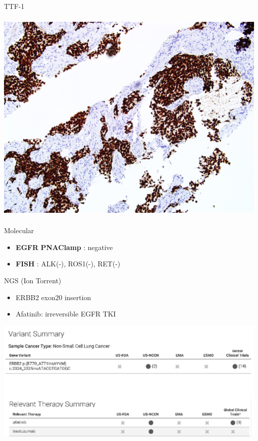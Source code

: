 \documentclass[
  ignorenonframetext,
]{beamer}
\providecommand{\tightlist}{%
  \setlength{\itemsep}{0pt}\setlength{\parskip}{0pt}}
\begin{document}
\begin{frame}{TTF-1}
\protect\hypertarget{ttf-1}{}

\includegraphics[width=\textwidth,height=4.16667in]{assets/img/immuno.png}

\end{frame}

\begin{frame}{Molecular}
\protect\hypertarget{molecular}{}

\begin{itemize}
\tightlist
\item
  \textbf{EGFR} \textbf{PNAClamp} : negative
\item
  \textbf{FISH} : ALK(-), ROS1(-), RET(-)
\end{itemize}

\end{frame}

\begin{frame}{NGS (Ion Torrent)}
\protect\hypertarget{ngs-ion-torrent}{}

\begin{itemize}
\tightlist
\item
  ERBB2 exon20 insertion\\
\item
  Afatinib: irreversible EGFR TKI
\end{itemize}

\includegraphics{assets/img/OCR.png}

\end{frame}
\end{document}
